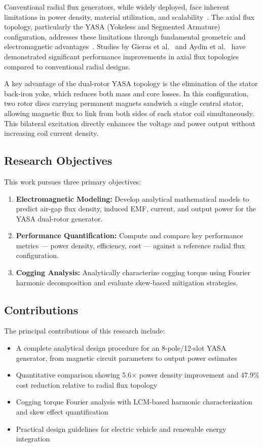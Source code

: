 \documentclass[12pt,a4paper]{article}
\begin{document}
Conventional radial flux generators, while widely deployed, face inherent limitations in power density, material utilization, and scalability~\cite{ref8,ref9}. The axial flux topology, particularly the YASA (Yokeless and Segmented Armature) configuration, addresses these limitations through fundamental geometric and electromagnetic advantages~\cite{ref10,ref11,ref12}. Studies by Gieras et al.~\cite{ref13} and Aydin et al.~\cite{ref14} have demonstrated significant performance improvements in axial flux topologies compared to conventional radial designs.

A key advantage of the dual-rotor YASA topology is the elimination of the stator back-iron yoke, which reduces both mass and core losses. In this configuration, two rotor discs carrying permanent magnets sandwich a single central stator, allowing magnetic flux to link from both sides of each stator coil simultaneously. This bilateral excitation directly enhances the voltage and power output without increasing coil current density.

\subsection{Research Objectives}
This work pursues three primary objectives:

\begin{enumerate}
\item \textbf{Electromagnetic Modeling:} Develop analytical mathematical models to predict air-gap flux density, induced EMF, current, and output power for the YASA dual-rotor generator.
\item \textbf{Performance Quantification:} Compute and compare key performance metrics — power density, efficiency, cost — against a reference radial flux configuration.
\item \textbf{Cogging Analysis:} Analytically characterize cogging torque using Fourier harmonic decomposition and evaluate skew-based mitigation strategies.
\end{enumerate}

\subsection{Contributions}
The principal contributions of this research include:

\begin{itemize}
\item A complete analytical design procedure for an 8-pole/12-slot YASA generator, from magnetic circuit parameters to output power estimates
\item Quantitative comparison showing 5.6$\times$ power density improvement and 47.9\% cost reduction relative to radial flux topology
\item Cogging torque Fourier analysis with LCM-based harmonic characterization and skew effect quantification
\item Practical design guidelines for electric vehicle and renewable energy integration
\end{itemize}
\end{document}
